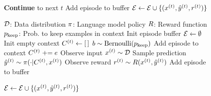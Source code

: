 \begin{figure}[t]
\begin{minipage}[t]{0.475\textwidth}
\begin{algorithm}[H]
\begin{algorithmic}[1]
                  \STATE \textbf{Continue} to next $t$ 
                \label{ln:naiveplus:continue}
                \ENDIF
                \STATE Add episode to buffer  $\mathcal{E} \gets \mathcal{E} \cup \{(x^{(t)}, \hat{y}^{(t)}, r^{(t)})\}$
            \ENDFOR
        \end{algorithmic}
    \end{algorithm}
    \end{minipage}
    \hspace{0.02\textwidth}
    \begin{minipage}[t]{0.475\textwidth}
        \centering
        \begin{algorithm}[H]
            \footnotesize
            \caption{\explorative}\label{alg:explorative_icrl}
            \begin{algorithmic}[1]
                \REQUIRE
                \STATEX $\mathcal{D}$: Data distribution
                \STATEX $\pi$: Language model policy
                \STATEX $R$: Reward function
                \STATEX $p_\text{keep}$: Prob. to keep examples in context
                \STATEX
                \STATE Init episode buffer $\mathcal{E} \gets \emptyset$
                    \STATE Init empty context $C^{(t)} \gets [\,]$ \label{ln:eicrl:initc}
                    \FOR{$\episode \in \episodeset$}\label{ln:eicrl:context_loop_start}
                        \STATE $b \sim \text{Bernoulli}(p_\text{keep})$
                            \STATE Add episode to context $C^{(t)} \mathrel{+}= e$
                        \ENDIF
                    \ENDFOR\label{ln:eicrl:context_loop_end}
                    \STATE Observe input $x^{(t)} \sim \mathcal{D}$
                    \STATE Sample prediction $\hat{y}^{(t)} \sim \pi( \cdot \vert C^{(t)}, x^{(t)})$ \label{ln:eicrl:prediction}
                    \STATE Observe reward $r^{(t)} \sim R(x^{(t)}, \hat{y}^{(t)})$
                     \label{ln:eicrl:reward_cond}
                        \STATE Add episode to buffer \par \hspace{1em}  $\mathcal{E} \gets \mathcal{E} \cup \{(x^{(t)}, \hat{y}^{(t)}, r^{(t)})\}$
                    \ENDIF\label{ln:eicrl:add_episode}
                \ENDFOR
            \end{algorithmic}
        \end{algorithm}
    \end{minipage}
\vspace{-10pt}
\end{figure}

